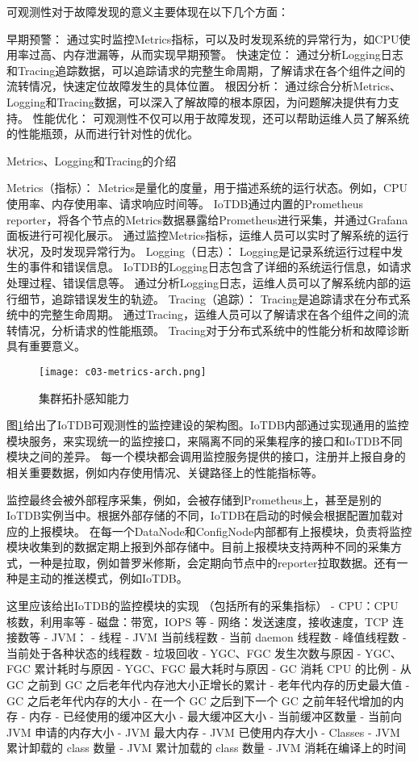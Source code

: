 可观测性对于故障发现的意义主要体现在以下几个方面：

早期预警： 通过实时监控Metrics指标，可以及时发现系统的异常行为，如CPU使用率过高、内存泄漏等，从而实现早期预警。
快速定位： 通过分析Logging日志和Tracing追踪数据，可以追踪请求的完整生命周期，了解请求在各个组件之间的流转情况，快速定位故障发生的具体位置。
根因分析： 通过综合分析Metrics、Logging和Tracing数据，可以深入了解故障的根本原因，为问题解决提供有力支持。
性能优化： 可观测性不仅可以用于故障发现，还可以帮助运维人员了解系统的性能瓶颈，从而进行针对性的优化。


Metrics、Logging和Tracing的介绍

Metrics（指标）：
Metrics是量化的度量，用于描述系统的运行状态。例如，CPU使用率、内存使用率、请求响应时间等。
IoTDB通过内置的Prometheus reporter，将各个节点的Metrics数据暴露给Prometheus进行采集，并通过Grafana面板进行可视化展示。
通过监控Metrics指标，运维人员可以实时了解系统的运行状况，及时发现异常行为。
Logging（日志）：
Logging是记录系统运行过程中发生的事件和错误信息。
IoTDB的Logging日志包含了详细的系统运行信息，如请求处理过程、错误信息等。
通过分析Logging日志，运维人员可以了解系统内部的运行细节，追踪错误发生的轨迹。
Tracing（追踪）：
Tracing是追踪请求在分布式系统中的完整生命周期。
通过Tracing，运维人员可以了解请求在各个组件之间的流转情况，分析请求的性能瓶颈。
Tracing对于分布式系统中的性能分析和故障诊断具有重要意义。

\begin{figure}
  \centering
  \texttt{[image: c03-metrics-arch.png]}
  \caption{集群拓扑感知能力}
  \label{fig:c03-metrics-arch}
\end{figure}

图\ref{fig:c03-metrics-arch}给出了IoTDB可观测性的监控建设的架构图。IoTDB内部通过实现通用的监控模块服务，来实现统一的监控接口，来隔离不同的采集程序的接口和IoTDB不同模块之间的差异。
每一个模块都会调用监控服务提供的接口，注册并上报自身的相关重要数据，例如内存使用情况、关键路径上的性能指标等。

监控最终会被外部程序采集，例如，会被存储到Prometheus上，甚至是别的IoTDB实例当中。根据外部存储的不同，IoTDB在启动的时候会根据配置加载对应的上报模块。
在每一个DataNode和ConfigNode内部都有上报模块，负责将监控模块收集到的数据定期上报到外部存储中。目前上报模块支持两种不同的采集方式，一种是拉取，例如普罗米修斯，会定期向节点中的reporter拉取数据。还有一种是主动的推送模式，例如IoTDB。



这里应该给出IoTDB的监控模块的实现
（包括所有的采集指标）
- CPU：CPU 核数，利用率等
- 磁盘：带宽，IOPS 等
- 网络：发送速度，接收速度，TCP 连接数等
- JVM：
  - 线程
    - JVM 当前线程数
    - 当前 daemon 线程数
    - 峰值线程数
    - 当前处于各种状态的线程数
  - 垃圾回收
    - YGC、FGC 发生次数与原因
    - YGC、FGC 累计耗时与原因
    - YGC、FGC 最大耗时与原因
    - GC 消耗 CPU 的比例
    - 从 GC 之前到 GC 之后老年代内存池大小正增长的累计
    - 老年代内存的历史最大值
    - GC 之后老年代内存的大小
    - 在一个 GC 之后到下一个 GC 之前年轻代增加的内存
  - 内存
    - 已经使用的缓冲区大小
    - 最大缓冲区大小
    - 当前缓冲区数量
    - 当前向 JVM 申请的内存大小
    - JVM 最大内存
    - JVM 已使用内存大小
  - Classes
    - JVM 累计卸载的 class 数量
    - JVM 累计加载的 class 数量
    - JVM 消耗在编译上的时间